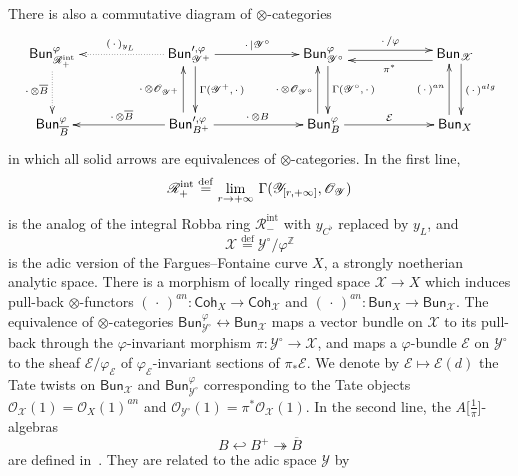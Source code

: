 \documentclass[11pt]{article}
\theoremstyle{definition}
\numberwithin{equation}{section}
\numberwithin{figure}{section}
\numberwithin{table}{section}
\newcommand{\Coh}{\mathsf{Coh}}
\newcommand{\Bun}{\mathsf{Bun}}
\newcommand{\eqd}{\stackrel{\mathrm{def}}{=}}
\begin{document}
There is also a commutative diagram of $\otimes$-categories~\cite[\S 11.4]{FaFo15}
\[
\xymatrix@R=2.5pc@C=5pc{\Bun_{\mathscr{R}_{+}^{\mathrm{int}}}^{\varphi}\ar@{.>}[d]_{{\,\cdot\,}\otimes\overline{B}} & \Bun_{\mathscr{Y}^{+}}^{\prime,\varphi}\ar@{.>}[l]_{({\,\cdot\,})_{y_{L}}}\ar[r]^{{\,\cdot\,}\vert\mathscr{Y}^{\circ}}\ar@<1ex>[d]^{\Gamma(\mathscr{Y}^{+},{\,\cdot\,})} & \Bun_{\mathscr{Y}^{\circ}}^{\varphi}\ar@<.7ex>[r]^{{\,\cdot\,}/\varphi}\ar@<.7ex>[d]^{\Gamma(\mathscr{Y}^{\circ},{\,\cdot\,})} & \Bun_{\mathscr{X}}\ar@<1ex>[l]^{\pi^{\ast}}\ar@<1ex>[d]^{({\,\cdot\,})^{alg}}\\
\Bun_{\overline{B}}^{\varphi} & \Bun_{B^{+}}^{\prime,\varphi}\ar[l]_{{\,\cdot\,}\otimes\overline{B}}\ar[r]^{{\,\cdot\,}\otimes B}\ar@<1ex>[u]^{{\,\cdot\,}\otimes\mathscr{O}_{\mathscr{Y}^{+}}} & \Bun_{B}^{\varphi}\ar[r]^{\mathcal{E}}\ar@<1ex>[u]^{{\,\cdot\,}\otimes\mathscr{O}_{\mathscr{Y}^{\circ}}} & \Bun_{X}\ar@<1ex>[u]^{({\,\cdot\,})^{an}} }
\]
in which all solid arrows are equivalences of $\otimes$-categories. In the first line,
\[
\mathscr{R}_{+}^{\mathrm{int}}\eqd\lim_{r\rightarrow\text{+\ensuremath{\infty}}}\,\Gamma(\mathscr{Y}_{[r,+\infty]},\mathscr{O}_{\mathscr{Y}})
\]
is the analog of the integral Robba ring $\mathscr{R}_{-}^{\mathrm{int}}$ with $y_{C^{\flat}}$ replaced by $y_{L}$, and
\[
\mathscr{X}\eqd\mathscr{Y}^{\circ}/\varphi^{\mathbb{Z}}
\]
is the adic version of the Fargues--Fontaine curve $X$, a strongly noetherian analytic space. There is a morphism of locally ringed space $\mathscr{X}\rightarrow X$ which induces pull-back $\otimes$-functors $({\,\cdot\,})^{an}:\Coh_{X}\rightarrow\Coh_{\mathscr{X}}$ and $({\,\cdot\,})^{an}:\Bun_{X}\rightarrow\Bun_{\mathscr{X}}$. The equivalence of $\otimes$-categories $\Bun_{\mathscr{Y}^{\circ}}^{\varphi}\leftrightarrow\Bun_{\mathscr{X}}$ maps a vector bundle on $\mathscr{X}$ to its pull-back through the $\varphi$-invariant morphism $\pi:\mathscr{Y}^{\circ}\rightarrow\mathscr{X}$, and maps a $\varphi$-bundle $\mathscr{E}$ on $\mathscr{Y}^{\circ}$ to the sheaf $\mathscr{E}/\varphi_{\mathscr{E}}$ of $\varphi_{\mathscr{E}}$-invariant sections of $\pi_{\ast}\mathscr{E}$. We denote by $\mathscr{E}\mapsto\mathscr{E}(d)$ the Tate twists on $\Bun_{\mathscr{X}}$ and $\Bun_{\mathscr{Y}^{\circ}}^{\varphi}$ corresponding to the Tate objects $\mathscr{O}_{\mathscr{X}}(1)=\mathcal{O}_{X}(1)^{an}$ and $\mathscr{O}_{\mathscr{Y}^{\circ}}(1)=\pi^{\ast}\mathscr{O}_{\mathscr{X}}(1)$. In the second line, the $A${[}$\frac{1}{\pi}]$-algebras
\[
B\hookleftarrow B^{+}\twoheadrightarrow\overline{B}
\]
are defined in~\cite[1.10]{FaFo15}. They are related to the adic space $\mathscr{Y}$ by
\end{document}

